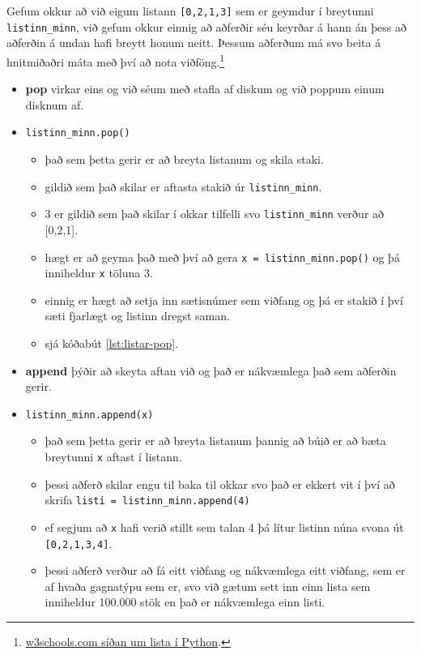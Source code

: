 Gefum okkur að við eigum listann \texttt{[0,2,1,3]} sem er geymdur í breytunni \texttt{listinn\_minn}, við gefum okkur einnig að aðferðir séu keyrðar á hann án þess að aðferðin á undan hafi breytt honum neitt.
Þessum aðferðum má svo beita á hnitmiðaðri máta með því að nota viðföng.\footnote{\href{https://www.w3schools.com/python/python_lists.asp}{w3schools.com síðan um lista í Python}.}
\vspace{0.4cm}
\begin{itemize}[]
	\item \textbf{pop} virkar eins og við séum með stafla af diskum og við poppum einum disknum af.
	\item[] \texttt{listinn\_minn.pop()}
	\begin{itemize}
		\item það sem þetta gerir er að breyta listanum og skila staki.
		\item gildið sem það skilar er aftasta stakið úr \texttt{listinn\_minn}.
		\item 3 er gildið sem það skilar í okkar tilfelli svo \texttt{listinn\_minn} verður að [0,2,1].
		\item hægt er að geyma það með því að gera \texttt{x = listinn\_minn.pop()} og þá inniheldur \texttt{x} töluna 3.
		\item einnig er hægt að setja inn sætisnúmer sem viðfang og þá er stakið í því sæti fjarlægt og listinn dregst saman.
		\item sjá kóðabút \ref{lst:listar-pop}.
	\end{itemize}
	\vspace{0.6cm}
	\item \textbf{append} þýðir að skeyta aftan við og það er nákvæmlega það sem aðferðin gerir.
	\item[] \texttt{listinn\_minn.append(x)}
	\begin{itemize}
		\item það sem þetta gerir er að breyta listanum þannig að búið er að bæta breytunni \texttt{x} aftast í listann.
		\item þessi aðferð skilar engu til baka til okkar svo það er ekkert vit í því að skrifa \texttt{listi = listinn\_minn.append(4)}
		\item ef segjum að \texttt{x} hafi verið stillt sem talan 4 þá lítur listinn núna svona út \texttt{[0,2,1,3,4]}.
		\item þessi aðferð verður að fá eitt viðfang og nákvæmlega eitt viðfang, sem er af hvaða gagnatýpu sem er, svo við gætum sett inn einn lista sem inniheldur 100.000 stök en það er nákvæmlega einn listi.

\end{itemize}
\end{itemize}
